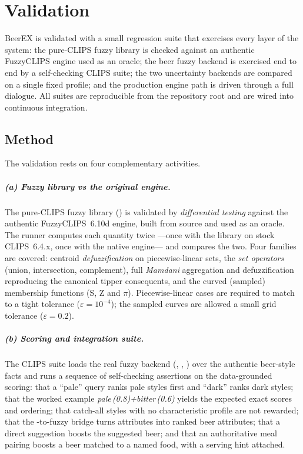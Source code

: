 \chapter{Validation}
\label{chap:validation}

BeerEX is validated with a small regression suite that exercises every layer of
the system: the pure-CLIPS fuzzy library is checked against an authentic
FuzzyCLIPS engine used as an oracle; the beer fuzzy backend is exercised end to
end by a self-checking CLIPS suite; the two uncertainty backends are compared on
a single fixed profile; and the production engine path is driven through a full
dialogue. All suites are reproducible from the repository root and are wired into
continuous integration.

\section{Method}

The validation rests on four complementary activities.

\paragraph{(a) Fuzzy library vs the original engine.}
The pure-CLIPS fuzzy library () is
validated by \emph{differential testing} against the authentic
FuzzyCLIPS~6.10d engine, built from source and used as an oracle. The runner
 computes each quantity twice ---once with the library on
stock CLIPS~6.4.x, once with the native engine--- and compares the two. Four
families are covered: centroid \emph{defuzzification} on piecewise-linear sets,
the \emph{set operators} (union, intersection, complement), full \emph{Mamdani}
aggregation and defuzzification reproducing the canonical tipper consequents,
and the curved (sampled) membership functions (S, Z and $\pi$). Piecewise-linear
cases are required to match to a tight tolerance ($\varepsilon = 10^{-4}$); the
sampled curves are allowed a small grid tolerance ($\varepsilon = 0.2$).

\paragraph{(b) Scoring and integration suite.}
The CLIPS suite  loads the real fuzzy backend
(, , ) over the
authentic beer-style facts and runs a sequence of self-checking assertions on
the data-grounded scoring: that a ``pale'' query ranks pale styles first and
``dark'' ranks dark styles; that the worked example
\emph{pale\,(0.8)+bitter\,(0.6)} yields the expected exact scores and ordering;
that catch-all styles with no characteristic profile are not rewarded; that the
\cf{}-to-fuzzy bridge turns  attributes into ranked beer
attributes; that a direct suggestion boosts the suggested beer; and that an
authoritative meal pairing boosts a beer matched to a named food, with a serving
hint attached.

